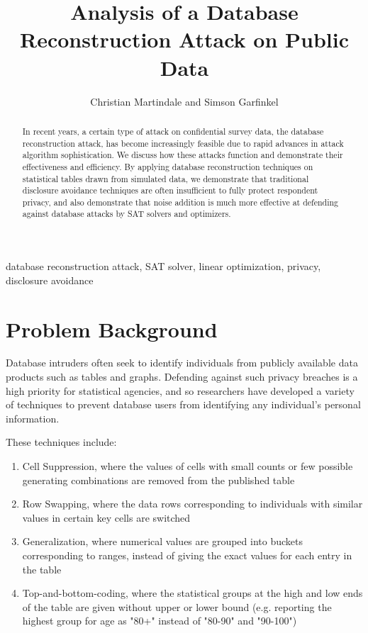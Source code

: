 \documentclass[5p,times,11pt]{elsarticle}
\begin{document}
\begin{frontmatter}
\title{Analysis of a Database Reconstruction Attack on Public Data}

\author{Christian Martindale and Simson Garfinkel}
\address{Center for Disclosure Avoidance, U.S. Census Bureau}

\begin{abstract}
In recent years, a certain type of attack on confidential survey data,
the database reconstruction attack, has become increasingly feasible due to rapid advances in attack algorithm
sophistication. We discuss how these attacks
function and demonstrate their effectiveness and efficiency. By applying database reconstruction techniques on statistical tables drawn from simulated data, we demonstrate that traditional disclosure avoidance techniques are often insufficient to fully protect respondent privacy, and also demonstrate that noise addition is much more effective at defending against database attacks by SAT solvers and optimizers.
\end{abstract}


\begin{keyword}
database reconstruction attack, SAT solver, linear optimization, privacy, disclosure avoidance
\end{keyword}
\end{frontmatter}


\section{Problem Background}
Database intruders often seek to identify individuals from publicly
available data products such as tables and graphs.
Defending against such privacy breaches is
a high priority for statistical agencies, and so researchers
have developed a variety of techniques to prevent database users
from identifying any individual's personal information.

These techniques include:
\begin{enumerate}
  \item Cell Suppression, where the values of cells with small counts or few possible
        generating combinations are removed from the published table
  \item Row Swapping, where the data rows corresponding to individuals
        with similar values in certain key cells are switched
  \item Generalization, where numerical values are grouped into
        buckets corresponding to ranges, instead of giving the exact
        values for each entry in the table
  \item Top-and-bottom-coding, where the statistical groups at the high and low ends
        of the table are given without upper or lower bound (e.g.
        reporting the highest group for age as "80+" instead of
        "80-90" and "90-100")
\end{enumerate}
\end{document}
